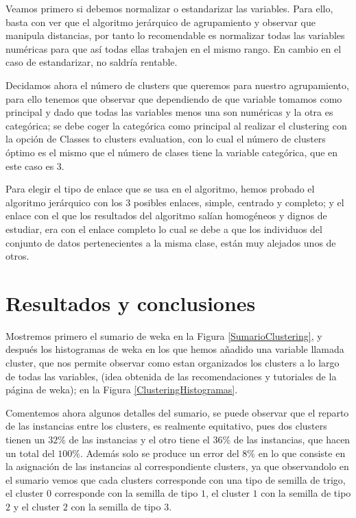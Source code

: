 \documentclass[a4paper, 11pt, twoside, openany, onecolumn, final]{memoir}
\begin{document}
	Veamos primero si debemos normalizar o estandarizar las variables. Para ello, basta con ver que el algoritmo jerárquico de agrupamiento y observar que manipula distancias, por tanto lo recomendable es normalizar todas las variables numéricas para que así todas ellas trabajen en el mismo rango. En cambio en el caso de estandarizar, no saldría rentable.  
	
	Decidamos ahora el número de clusters que queremos para nuestro agrupamiento, para ello tenemos que observar que dependiendo de que variable tomamos como principal y dado que todas las variables menos una son numéricas y la otra es categórica; se debe coger la categórica como principal al realizar el clustering con la opción de Classes to clusters evaluation, con lo cual el número de clusters óptimo es el mismo que el número de clases tiene la variable categórica, que en este caso es $3$.
	
	Para elegir el tipo de enlace que se usa en el algoritmo, hemos probado el algoritmo jerárquico con los $3$ posibles enlaces, simple, centrado y completo; y el enlace con el que los resultados del algoritmo salían homogéneos y dignos de estudiar, era con el enlace completo lo cual se debe a que los individuos del conjunto de datos pertenecientes a la misma clase, están muy alejados unos de otros.
	
	\section{Resultados y conclusiones}
	Mostremos primero el sumario de weka en la Figura \ref{SumarioClustering}, y después los histogramas de weka en los que hemos añadido una variable llamada cluster, que nos permite observar como estan organizados los clusters a lo largo de todas las variables, (idea obtenida de las recomendaciones y tutoriales de la página de weka); en la Figura \ref{ClusteringHistogramas}.

Comentemos ahora algunos detalles del sumario, se puede observar que el reparto de las instancias entre los clusters, es realmente equitativo, pues dos clusters tienen un $32\%$ de las instancias y el otro tiene el $36\%$ de las instancias, que hacen un total del $100\%$. Además solo se produce un error del $8\%$ en lo que consiste en la asignación de las instancias al correspondiente clusters, ya que observandolo en el sumario vemos que cada clusters corresponde con una tipo de semilla de trigo, el cluster $0$ corresponde con la semilla de tipo $1$, el cluster $1$ con la semilla de tipo $2$ y el cluster $2$ con la semilla de tipo $3$.
\end{document}
